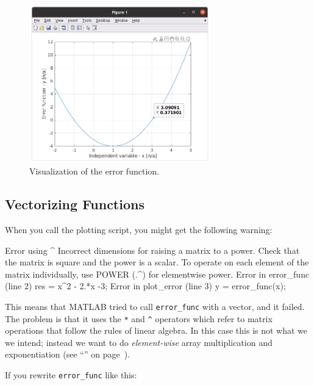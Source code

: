 \begin{figure}[h]
    \centerline{\includegraphics[width=0.7\textwidth]{images/error_w_data.png}}
    \caption{Visualization of the error function.}
    \label{f:error_data}
\end{figure}


    \subsection{Vectorizing Functions}


When you call the plotting script, you might get the following warning:

\begin{stdout}
Error using  ^ 
Incorrect dimensions for raising a matrix to a power. Check that the matrix
is square and the power is a
scalar. To operate on each element of the matrix individually, 
use POWER (.^) for elementwise power.
Error in error_func (line 2)
    res = x^2 - 2.*x -3;
Error in plot_error (line 3)
y = error_func(x); 
\end{stdout}

This means that MATLAB tried to call \lstinline{error_func} with a vector, and it failed.
The problem is that it uses the \lstinline{*} and \lstinline{^} operators which refer to matrix operations that follow the rules of linear algebra.  In this case this is not what we we intend; instead we want to do \emph{element-wise} array multiplication and exponentiation (see ``'' on page~\pageref{elementwise}).


If you rewrite \lstinline{error_func} like this:

